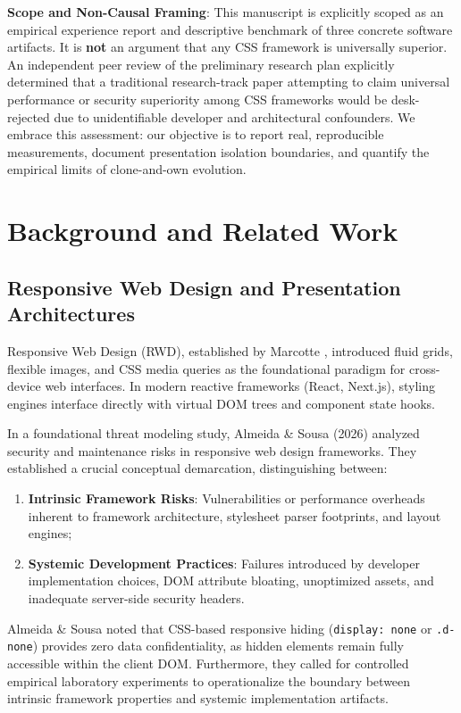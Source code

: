 \documentclass[conference]{IEEEtran}
\begin{document}
\textbf{Scope and Non-Causal Framing}: This manuscript is explicitly scoped as an empirical experience report and descriptive benchmark of three concrete software artifacts. It is \textbf{not} an argument that any CSS framework is universally superior. An independent peer review of the preliminary research plan explicitly determined that a traditional research-track paper attempting to claim universal performance or security superiority among CSS frameworks would be desk-rejected due to unidentifiable developer and architectural confounders. We embrace this assessment: our objective is to report real, reproducible measurements, document presentation isolation boundaries, and quantify the empirical limits of clone-and-own evolution.

\section{Background and Related Work}

\subsection{Responsive Web Design and Presentation Architectures}
Responsive Web Design (RWD), established by Marcotte \cite{marcotte2010responsive}, introduced fluid grids, flexible images, and CSS media queries as the foundational paradigm for cross-device web interfaces. In modern reactive frameworks (React, Next.js), styling engines interface directly with virtual DOM trees and component state hooks.

In a foundational threat modeling study, Almeida \& Sousa (2026) \cite{almeida2026security} analyzed security and maintenance risks in responsive web design frameworks. They established a crucial conceptual demarcation, distinguishing between:
\begin{enumerate}
    \item \textbf{Intrinsic Framework Risks}: Vulnerabilities or performance overheads inherent to framework architecture, stylesheet parser footprints, and layout engines;
    \item \textbf{Systemic Development Practices}: Failures introduced by developer implementation choices, DOM attribute bloating, unoptimized assets, and inadequate server-side security headers.
\end{enumerate}

Almeida \& Sousa noted that CSS-based responsive hiding (\texttt{display: none} or \texttt{.d-none}) provides zero data confidentiality, as hidden elements remain fully accessible within the client DOM. Furthermore, they called for controlled empirical laboratory experiments to operationalize the boundary between intrinsic framework properties and systemic implementation artifacts.
\end{document}
